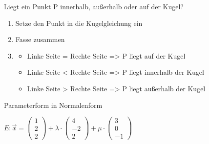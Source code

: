 \documentclass[paper=a6,landscape,ngerman,twoside=true,fontsize=12pt]{scrartcl}
\begin{document}
\begin{frage}
	\LARGE
	Liegt ein Punkt P innerhalb, außerhalb oder auf der Kugel?
\end{frage}
\begin{antwort}
		
	\begin{enumerate} 
		\item Setze den Punkt in die Kugelgleichung ein
		\item Fasse zusammen
		\item\normalsize 	\begin{itemize}
				\item Linke Seite = Rechte Seite => P liegt auf der Kugel
				\item Linke Seite < Rechte Seite => P liegt innerhalb der Kugel
				\item Linke Seite > Rechte Seite => P liegt außerhalb der Kugel
				\end{itemize}	
	\end{enumerate} 
	
\end{antwort}	
\begin{frage}
	\LARGE
	Parameterform in Normalenform
	\bigskip
	
		$E:\vec{x}=\left(\begin{array}{c} 1 \\ 2 \\ 2\end{array} \right)+\lambda \cdot \left(\begin{array}{c} 4 \\ -2 \\ 2\end{array} \right)+\mu \cdot \left(\begin{array}{c} 3 \\0 \\ -1\end{array} \right)$
\end{frage}
\end{document}
